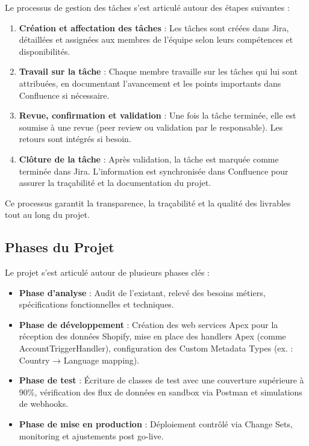 Le processus de gestion des tâches s'est articulé autour des étapes suivantes :
\begin{enumerate}
    \item \textbf{Création et affectation des tâches} : Les tâches sont créées dans Jira, détaillées et assignées aux membres de l'équipe selon leurs compétences et disponibilités.
    \item \textbf{Travail sur la tâche} : Chaque membre travaille sur les tâches qui lui sont attribuées, en documentant l'avancement et les points importants dans Confluence si nécessaire.
    \item \textbf{Revue, confirmation et validation} : Une fois la tâche terminée, elle est soumise à une revue (peer review ou validation par le responsable). Les retours sont intégrés si besoin.
    \item \textbf{Clôture de la tâche} : Après validation, la tâche est marquée comme terminée dans Jira. L'information est synchronisée dans Confluence pour assurer la traçabilité et la documentation du projet.
\end{enumerate}
Ce processus garantit la transparence, la traçabilité et la qualité des livrables tout au long du projet.

\subsection{Phases du Projet}

\begin{mdframed}[backgroundcolor=lightblue, linewidth=0pt, innerleftmargin=10pt, innerrightmargin=10pt]
Le projet s'est articulé autour de plusieurs phases clés :
\begin{itemize}
    \item \textbf{Phase d'analyse} : Audit de l'existant, relevé des besoins métiers, spécifications fonctionnelles et techniques.
    \item \textbf{Phase de développement} : Création des web services Apex pour la réception des données Shopify, mise en place des handlers Apex (comme AccountTriggerHandler), configuration des Custom Metadata Types (ex. : Country → Language mapping).
    \item \textbf{Phase de test} : Écriture de classes de test avec une couverture supérieure à 90\%, vérification des flux de données en sandbox via Postman et simulations de webhooks.
    \item \textbf{Phase de mise en production} : Déploiement contrôlé via Change Sets, monitoring et ajustements post go-live.
\end{itemize}
\end{mdframed}

